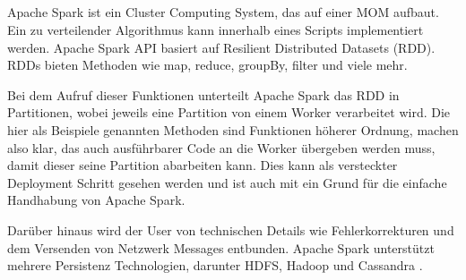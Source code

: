 \subsection{\ApacheSpark{}}
Apache Spark ist ein Cluster Computing System, das auf einer MOM aufbaut.
Ein zu verteilender Algorithmus kann innerhalb eines Scripts implementiert werden.
Apache Spark API basiert auf Resilient Distributed Datasets (RDD).
RDDs bieten Methoden wie map, reduce, groupBy, filter und viele mehr.

Bei dem Aufruf dieser Funktionen unterteilt Apache Spark das RDD in Partitionen, wobei jeweils eine Partition von einem Worker verarbeitet wird.
Die hier als Beispiele genannten Methoden sind Funktionen höherer Ordnung, machen also klar, das auch ausführbarer Code an die Worker übergeben werden muss, damit dieser seine Partition abarbeiten kann.
Dies kann als versteckter Deployment Schritt gesehen werden und ist auch mit ein Grund für die einfache Handhabung von Apache Spark.

Darüber hinaus wird der User von technischen Details wie Fehlerkorrekturen und dem Versenden von Netzwerk Messages entbunden.
Apache  Spark unterstützt mehrere Persistenz Technologien, darunter HDFS, Hadoop und Cassandra \cite{zaharia2012resilient}.

